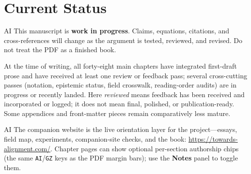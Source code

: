 \chapter*{Current Status}


\begin{authbar}{AI}
This manuscript is \textbf{work in progress}.
Claims, equations, citations, and cross-references will change as the argument is tested, reviewed, and revised.
Do not treat the PDF as a finished book.

At the time of writing, all forty-eight main chapters have integrated first-draft prose and have received at least one review or feedback pass; several cross-cutting passes (notation, epistemic status, field crosswalk, reading-order audits) are in progress or recently landed.
Here \emph{reviewed} means feedback has been received and incorporated or logged; it does not mean final, polished, or publication-ready.
Some appendices and front-matter pieces remain comparatively less mature.
\end{authbar}


\begin{authbar}{AI}
The companion website is the live orientation layer for the project---essays, field map, experiments, companion-site checks, and the book: \url{https://towards-alignment.com/}.
Chapter pages can show optional per-section authorship chips (the same \texttt{AI}/\texttt{GZ} keys as the PDF margin bars); use the \textbf{Notes} panel to toggle them.
\end{authbar}
